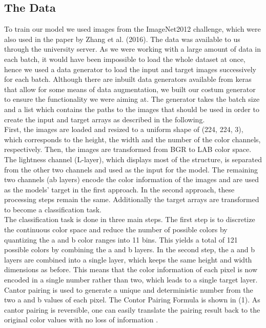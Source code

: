 \documentclass[12pt,letterpaper]{article}
\begin{document}
\subsection{The Data}
To train our model we used images from the ImageNet2012 challenge, which were also used in the paper by Zhang et al. (2016). The data was available to us through the university server. As we were working with a large amount of data in each batch, it would have been impossible to load the whole dataset at once, hence we used a data generator to load the input and target images successively for each batch. Although there are inbuilt data generators available from keras that allow for some means of data augmentation, we built our costum generator to ensure the functionality we were aiming at. The generator takes the batch size and a list which contains the paths to the images that should be used in order to create the input and target arrays as described in the following.\\
First, the images are loaded and resized to a uniform shape of (224, 224, 3), which corresponds to the height, the width and the number of the color channels, respectively. Then, the images are transformed from BGR to LAB color space. The lightness channel (L-layer), which displays most of the structure, is separated from the other two channels and used as the input for the model.  The remaining two channels (ab layers) encode the color information of the images and are used as the models’ target in the first approach. In the second approach, these processing steps remain the same. Additionally the target arrays are transformed to become a classification task.\\
The classification task is done in three main steps. The first step is to discretize the continuous color space and reduce the number of possible colors by quantizing the a and b color ranges into 11 bins. This yields a total of 121 possible colors by combining the a and b layers. In the second step, the a and b layers are combined into a single layer, which keeps the same height and width dimensions as before. This means that the color information of each pixel is now encoded in a single number rather than two, which leads to a single target layer. Cantor pairing is used to generate a unique and deterministic number from the two a and b values of each pixel. The Contor Pairing Formula is shown in (1). As cantor pairing is reversible, one can easily translate the pairing result back to the original color values with no loss of information \citep{cantor2007}.\\
\end{document}
